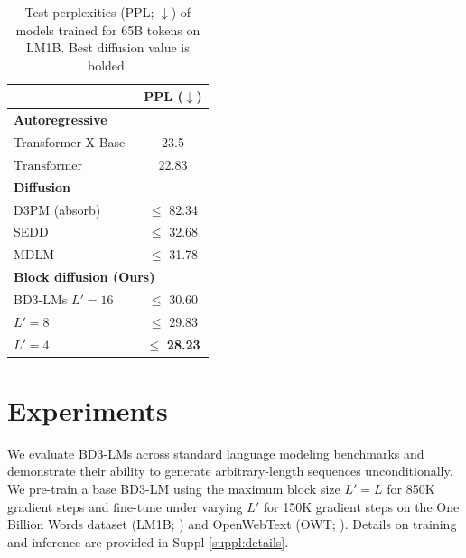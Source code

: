 \documentclass{article} %
\def\algos{BD3-LMs}
\def\algo{BD3-LM}
\begin{document}
\begin{table}
  \vspace{-20pt}
  \small
  \caption{Test perplexities (PPL; $\downarrow$) of models trained for 65B tokens on LM1B. Best diffusion value is bolded.}
  \label{tab:lm1b-ppl}
  \centering
  \vspace{-10pt}
  \setlength{\tabcolsep}{2pt} %
  \begin{tabular}{lc}
    \toprule
      & PPL ($\downarrow$) \\
    \midrule
    \multicolumn{2}{l}{\textbf{Autoregressive}} \\
    Transformer-X Base{~\citep{dai2019transformer}}  &  23.5 \\
    $\text{Transformer}$~\citep{sahoo2024simple}  & 22.83 \\
    \midrule
    \multicolumn{2}{l}{\textbf{Diffusion}} \\
    D3PM (absorb)~\citep{austin2021structured}  & $\leq$ 82.34  \\
    SEDD ~\citep{lou2024discrete}  & $\leq$ 32.68   \\
    MDLM ~\citep{sahoo2024simple}  & $\leq$ 31.78\\
    \midrule
    \multicolumn{2}{l}{\textbf{Block diffusion (Ours)}} \\
    \algos{} $L'=16$   & $\leq$ 30.60 \\ 
    \hspace{4.1em} $L'=8$   & $\leq$ 29.83\\
    \hspace{4.1em} $L'=4$  & $\leq$ \textbf{28.23}  \\
    \bottomrule
  \end{tabular}
  \vspace{-20pt}
\end{table}

\section{Experiments}\label{sec:experiments}

We evaluate \algos{} across standard language modeling benchmarks and demonstrate their ability to generate arbitrary-length sequences unconditionally. We pre-train a base \algo{} using the maximum block size $L'=L$ for 850K gradient steps and fine-tune under varying $L'$ for 150K gradient steps on the One Billion Words dataset (LM1B; \citet{chelba2014billion}) and OpenWebText (OWT; \citet{Gokaslan2019OpenWeb}). Details on training and inference are provided in Suppl \ref{suppl:details}.
\end{document}
